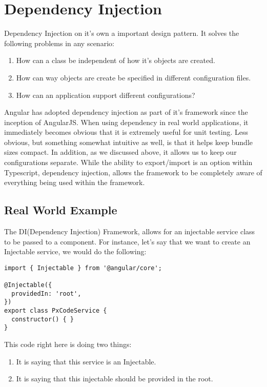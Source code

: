 \section{ Dependency Injection }
\maketitle{}

Dependency Injection on it's own a important design pattern. It solves the
following problems in any scenario:
\begin{enumerate}
  \item How can a class be independent of how it's objects are created.
  \item How can way objects are create be specified in different configuration
  files.
  \item How can an application support different configurations?
\end{enumerate}

Angular has adopted dependency injection as part of it's framework since the
inception of AngularJS. When using dependency in real world applications, it
immediately becomes obvious that it is extremely useful for unit testing. Less obvious, but something somewhat intuitive as well, is that it helps keep bundle
sizes compact. In addition, as we discussed above, it allows us to keep our
configurations separate. While the ability to export/import is an option within
Typescript, dependency injection, allows the framework to be completely aware
of everything being used within the framework.

\subsection{ Real World Example }
The DI(Dependency Injection) Framework, allows for an injectable service class
to be passed to a component. For instance, let's say that we want to create an
Injectable service, we would do the following:
\begin{lstlisting}
import { Injectable } from '@angular/core';

@Injectable({
  providedIn: 'root',
})
export class PxCodeService {
  constructor() { }
}
\end{lstlisting}

This code right here is doing two things:
\begin{enumerate}
  \item It is saying that this service is an Injectable.
  \item It is saying that this injectable should be provided in the root.
\end{enumerate}

